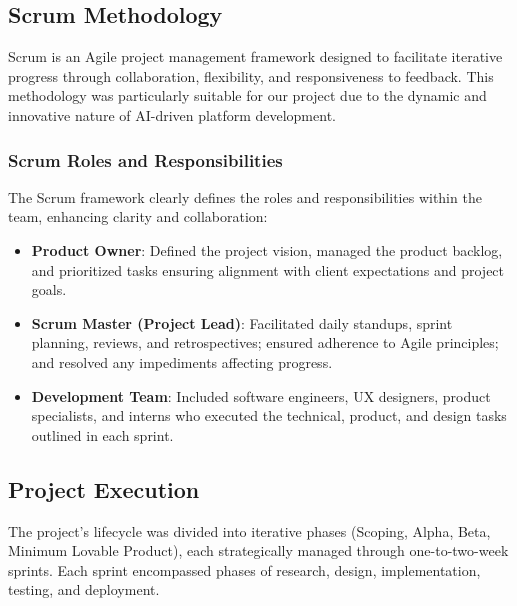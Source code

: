 \subsection{Scrum Methodology}
Scrum is an Agile project management framework designed to facilitate iterative progress through collaboration, flexibility, and responsiveness to feedback. This methodology was particularly suitable for our project due to the dynamic and innovative nature of AI-driven platform development.

\subsubsection{Scrum Roles and Responsibilities}
The Scrum framework clearly defines the roles and responsibilities within the team, enhancing clarity and collaboration:

\begin{itemize}
    \item \textbf{Product Owner}: Defined the project vision, managed the product backlog, and prioritized tasks ensuring alignment with client expectations and project goals.
    \item \textbf{Scrum Master (Project Lead)}: Facilitated daily standups, sprint planning, reviews, and retrospectives; ensured adherence to Agile principles; and resolved any impediments affecting progress.
    \item \textbf{Development Team}: Included software engineers, UX designers, product specialists, and interns who executed the technical, product, and design tasks outlined in each sprint.
\end{itemize}

\subsection{Project Execution}
The project's lifecycle was divided into iterative phases (Scoping, Alpha, Beta, Minimum Lovable Product), each strategically managed through one-to-two-week sprints. Each sprint encompassed phases of research, design, implementation, testing, and deployment.

